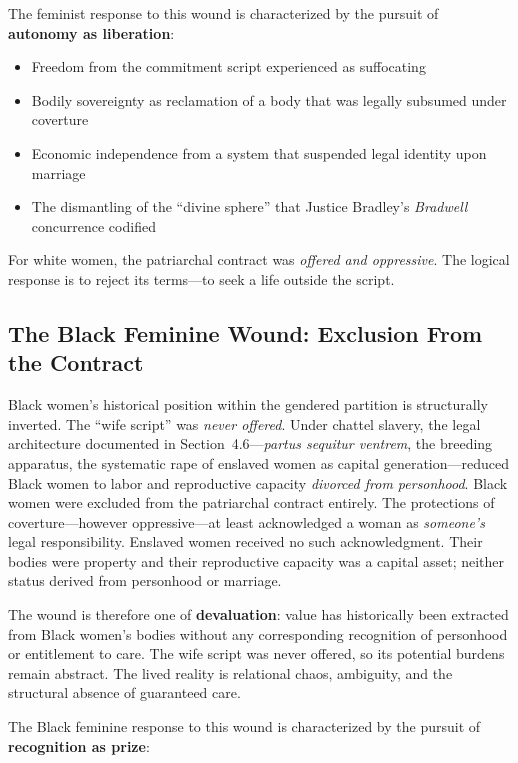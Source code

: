 The feminist response to this wound is characterized by the pursuit of \textbf{autonomy as liberation}:

\begin{itemize}
    \item Freedom from the commitment script experienced as suffocating
    \item Bodily sovereignty as reclamation of a body that was legally subsumed under coverture
    \item Economic independence from a system that suspended legal identity upon marriage
    \item The dismantling of the ``divine sphere'' that Justice Bradley's \textit{Bradwell} concurrence codified
\end{itemize}

For white women, the patriarchal contract was \textit{offered and oppressive}. The logical response is to reject its terms---to seek a life outside the script.

\subsection{The Black Feminine Wound: Exclusion From the Contract}

Black women's historical position within the gendered partition is structurally inverted. The ``wife script'' was \textit{never offered}. Under chattel slavery, the legal architecture documented in Section~4.6---\textit{partus sequitur ventrem}, the breeding apparatus, the systematic rape of enslaved women as capital generation---reduced Black women to labor and reproductive capacity \textit{divorced from personhood}. Black women were excluded from the patriarchal contract entirely. The protections of coverture---however oppressive---at least acknowledged a woman as \textit{someone's} legal responsibility. Enslaved women received no such acknowledgment. Their bodies were property and their reproductive capacity was a capital asset; neither status derived from personhood or marriage.

The wound is therefore one of \textbf{devaluation}: value has historically been extracted from Black women's bodies without any corresponding recognition of personhood or entitlement to care. The wife script was never offered, so its potential burdens remain abstract. The lived reality is relational chaos, ambiguity, and the structural absence of guaranteed care.

The Black feminine response to this wound is characterized by the pursuit of \textbf{recognition as prize}:

